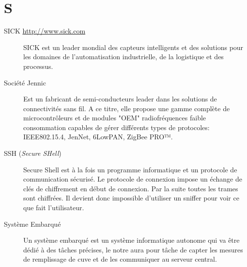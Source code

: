 \section{S}

\begin{description}

\item[SICK \url{http://www.sick.com}]
SICK est un leader mondial des capteurs intelligents et des solutions pour les 
domaines de l’automatisation industrielle, de la logistique et des processus.

\item[Société Jennic]
Est un fabricant  de semi-conducteurs leader dans les solutions de connectivités 
sans fil. A ce titre, elle propose une gamme complète de microcontrôleurs et de 
modules "OEM" radiofréquences faible consommation capables de gérer différents 
types de protocoles: IEEE802.15.4, JenNet, 6LowPAN, ZigBee PRO™.

\item[SSH (\textsl{Secure SHell})]
Secure Shell est à la fois un programme informatique et un protocole de 
communication sécurisé. Le protocole de connexion impose un échange de clés de 
chiffrement en début de connexion. Par la suite toutes les trames sont chiffrées. 
Il devient donc impossible d'utiliser un sniffer pour voir ce que fait l'utilisateur.

\item[Système Embarqué] Un système embarqué est un système informatique autonome
qui va être dédié à des tâches précises, le notre aura pour tâche de capter les 
mesures de remplissage de cuve et de les communiquer au serveur central.


\end{description}

